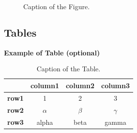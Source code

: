 \documentclass[11pt,a4paper]{article}
\begin{document}
\begin{figure}[H]
    \centering
    \quad
    \caption[]{Caption of the Figure.}
    \label{fig:quadtree2}
\end{figure}

\subsection{Tables}
\label{subsec:tables}

\begin{table}[H]
    \caption*{\textbf{Example of Table (optional)}}
    \centering 
    \begin{tabular}{|p{3em} c c c |}
    \hline
    \rowcolor{bluePoli!40}
     & \textbf{column1} & \textbf{column2} & \textbf{column3} \T\B \\
    \hline \hline
    \textbf{row1} & 1 & 2 & 3 \T\B \\
    \textbf{row2} & $\alpha$ & $\beta$ & $\gamma$ \T\B\\
    \textbf{row3} & alpha & beta & gamma \B\\
    \hline
    \end{tabular}
    \\[10pt]
    \caption{Caption of the Table.}
    \label{table:example}
\end{table}
\end{document}

